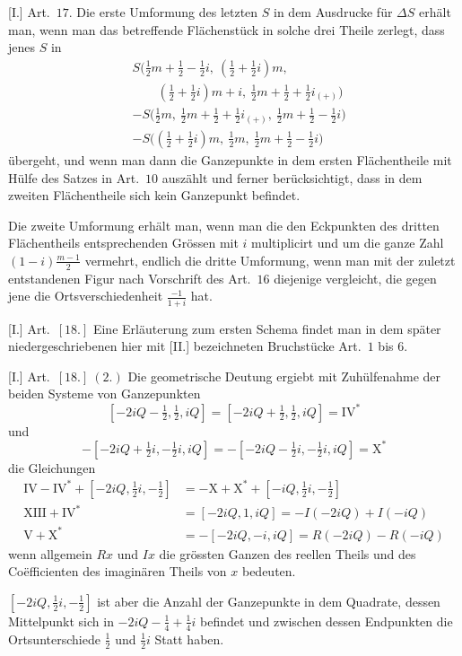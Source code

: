 [I.] Art.\ $17$. Die erste Umformung des letzten $S$ in dem Ausdrucke für $\Delta S$ erhält man, wenn man das betreffende Flächenstück in solche drei Theile zerlegt, dass jenes $S$ in
\[
\begin{aligned}
&S\bigl(\tfrac12m+\tfrac12-\tfrac12i,\ (\tfrac12+\tfrac12i)m,\\
&\qquad(\tfrac12+\tfrac12i)m+i,\ \tfrac12m+\tfrac12+\tfrac12i_{(+)}\bigr)\\
&-S\bigl(\tfrac12m,\ \tfrac12m+\tfrac12+\tfrac12i_{(+)},\ \tfrac12m+\tfrac12-\tfrac12i\bigr)\\
&-S\bigl((\tfrac12+\tfrac12i)m,\ \tfrac12m,\ \tfrac12m+\tfrac12-\tfrac12i\bigr)
\end{aligned}
\]
übergeht, und wenn man dann die Ganzepunkte in dem ersten Flächentheile mit Hülfe des Satzes in Art.\ $10$ auszählt und ferner berücksichtigt, dass in dem zweiten Flächentheile sich kein Ganzepunkt befindet.

Die zweite Umformung erhält man, wenn man die den Eckpunkten des dritten Flächentheils entsprechenden Grössen mit $i$ multiplicirt und um die ganze Zahl $(1-i)\frac{m-1}{2}$ vermehrt, endlich die dritte Umformung, wenn man mit der zuletzt entstandenen Figur nach Vorschrift des Art.\ $16$ diejenige vergleicht, die gegen jene die Ortsverschiedenheit $\frac{-1}{1+i}$ hat.

[I.] Art.\ $[18.]$ Eine Erläuterung zum ersten Schema findet man in dem später niedergeschriebenen hier mit [II.] bezeichneten Bruchstücke Art.\ $1$ bis $6$.

[I.] Art.\ $[18.]\ (2.)$ Die geometrische Deutung ergiebt mit Zuhülfenahme der beiden Systeme von Ganzepunkten
\[
[-2iQ-\tfrac12,\tfrac12,iQ]=[-2iQ+\tfrac12,\tfrac12,iQ]=\mathrm{IV}^{*}
\]
und
\[
-[-2iQ+\tfrac12i,-\tfrac12i,iQ]=-[-2iQ-\tfrac12i,-\tfrac12i,iQ]=\mathrm{X}^{*}
\]
die Gleichungen
\[
\begin{aligned}
\mathrm{IV}-\mathrm{IV}^{*}+[-2iQ,\tfrac12i,-\tfrac12]
&=-\mathrm{X}+\mathrm{X}^{*}+[-iQ,\tfrac12i,-\tfrac12]\\
\mathrm{XIII}+\mathrm{IV}^{*}&=[-2iQ,1,iQ]=-I(-2iQ)+I(-iQ)\\
\mathrm{V}+\mathrm{X}^{*}&=-[-2iQ,-i,iQ]=R(-2iQ)-R(-iQ)
\end{aligned}
\]
wenn allgemein $Rx$ und $Ix$ die grössten Ganzen des reellen Theils und des Coëfficienten des imaginären Theils von $x$ bedeuten.

$[-2iQ,\tfrac12i,-\tfrac12]$ ist aber die Anzahl der Ganzepunkte in dem Quadrate, dessen Mittelpunkt sich in $-2iQ-\tfrac14+\tfrac14i$ befindet und zwischen dessen Endpunkten die Ortsunterschiede $\tfrac12$ und $\tfrac12i$ Statt haben.

